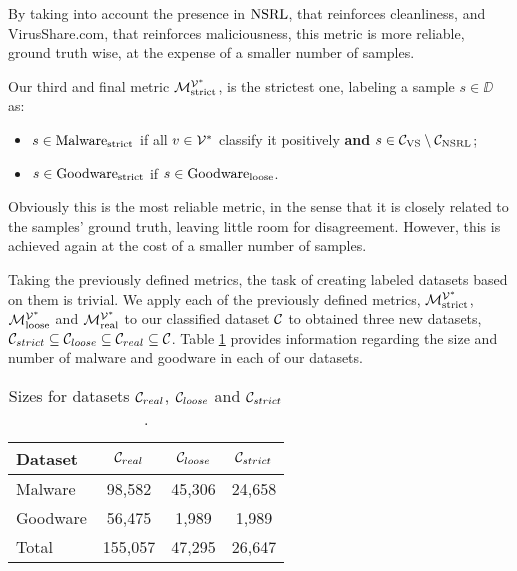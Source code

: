 By taking into account the presence in $\mathrm{NSRL}$, that reinforces cleanliness, and VirusShare.com, that reinforces maliciousness, this metric is more reliable, ground truth wise, at the expense of a smaller number of samples.

\medskip

Our third and final metric $\mathcal{M}_{\mathrm{strict}}^{\mathcal{V}^*}$, is the strictest one, labeling a sample $s\in\DD$ as:
\begin{itemize}
	\item $s\in\mathrm{Malware}_{\mathrm{strict}}$ if all $v\in\mathcal{V}^*$ classify it positively \textbf{and} $s\in\mathcal{C}_{\mathrm{VS}}\setminus\mathcal{C}_{\mathrm{NSRL}}$;
	\item $s\in\mathrm{Goodware}_{\mathrm{strict}}$ if $s\in\mathrm{Goodware}_{\mathrm{loose}}$.
\end{itemize}

Obviously this is the most reliable metric, in the sense that it is closely related to the samples' ground truth, leaving little room for disagreement. However, this is achieved again at the cost of a smaller number of samples.

\medskip

Taking the previously defined metrics, the task of creating labeled datasets based on them is trivial.
We apply each of the previously defined metrics, $\mathcal{M}_{\mathrm{strict}}^{\mathcal{V}^*}$, $\mathcal{M}_{\mathrm{loose}}^{\mathcal{V}^*}$ and $\mathcal{M}_{\mathrm{real}}^{\mathcal{V}^*}$ to our classified dataset $\mathcal{C}$ to obtained three new datasets, $\mathcal{C}_{strict}\subseteq\mathcal{C}_{loose}\subseteq\mathcal{C}_{real}\subseteq\mathcal{C}$.
Table \ref{tab:dataset_sizes} provides information regarding the size and number of malware and goodware in each of our datasets.

\begin{table}[!htb]
	\renewcommand{\arraystretch}{1.2} %
	\centering
	\begin{tabular}{l|ccc}
		Dataset			& $\mathcal{C}_{real}$ & $\mathcal{C}_{loose}$ & $\mathcal{C}_{strict}$	\\
		\hline
		Malware			& 98,582 & 45,306 & 24,658\\
		Goodware		& 56,475 & 1,989 & 1,989\\
		\hline
		Total			& 155,057 & 47,295 & 26,647\\
	\end{tabular}
	\smallskip
	\caption{Sizes for datasets $\mathcal{C}_{real}$, $\mathcal{C}_{loose}$ and $\mathcal{C}_{strict}$.}
	\label{tab:dataset_sizes}
\end{table}
